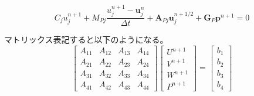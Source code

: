 \begin{equation}
\label{fluid-matrix-CN2}
		C_j u_j^{n+1}+M_{P j} \frac{u_j^{n+1}-\bm{u}_j^n}{\Delta t}+\bm{A}_{P j} \bm{u}_j^{n+1 / 2}+\bm{G}_P \bm{p}^{n+1}=0
\end{equation}

マトリックス表記すると以下のようになる。
\begin{equation}
	\left[\begin{array}{llll}
		A_{11} & A_{12} & A_{13} & A_{14}\\ 
		A_{21} & A_{22} & A_{23} & A_{24}\\ 
		A_{31} & A_{32} & A_{33} & A_{34}\\
		A_{41} & A_{42} & A_{43} & A_{44}
	\end{array}
	\right]\left
	[
	\begin{array}{l}
		U^{n+1} \\ 
		V^{n+1} \\
		W^{n+1} \\
		P^{n+1}
	\end{array}
	\right]
	=\left[
	\begin{array}{l}
		b_1 \\ 
		b_2 \\ 
		b_3 \\
		b_4
	\end{array}
	\right]
\end{equation}

